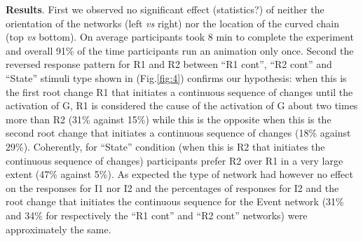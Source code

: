 \documentclass[10pt,letterpaper]{article}
\begin{document}
\textbf{Results}. First we observed no significant effect (statistics?) of neither the orientation of the networks (left \textit{vs} right) nor the location of the curved chain (top \textit{vs} bottom). On average participants took 8 min to complete the experiment and overall 91\% of the time participants run an animation only once. Second the reversed response pattern for R1 and R2 between ``R1 cont'', ``R2 cont'' and ``State'' stimuli type shown in (Fig.\ref{fig:4}) confirms our hypothesis: when this is the first root change R1 that initiates a continuous sequence of changes until the activation of G, R1 is considered the cause of the activation of G about two times more than R2 (31\% against 15\%) while this is the opposite when this is the second root change that initiates a continuous sequence of changes (18\% against 29\%). Coherently, for ``State'' condition (when this is R2 that initiates the continuous sequence of changes) participants prefer R2 over R1 in a very large extent (47\% against 5\%). As expected the type of network had however no effect on the responses for I1 nor I2 and the percentages of responses for I2 and the root change that initiates the continuous sequence for the Event network (31\% and 34\% for respectively the ``R1 cont'' and ``R2 cont'' networks) were approximately the same.
\end{document}
